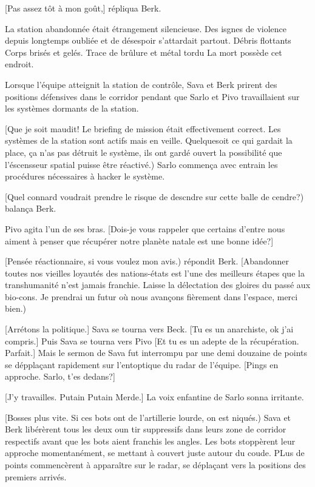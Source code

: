 [Pas assez tôt à mon goût,] répliqua Berk. 

La station abandonnée était étrangement silencieuse. Des isgnes de violence depuis longtemps oubliée et de désespoir s'attardait partout. Débris flottants Corps brisés et gelés. Trace de brûlure et métal tordu La mort possède cet endroit. 

Lorsque l'équipe atteignit la station de contrôle, Sava et Berk prirent des positions défensives dans le corridor pendant que Sarlo et Pivo travaillaient sur les systèmes dormants de la station. 

[Que je soit maudit! Le briefing de mission était effectivement correct. Les systèmes de la station sont actifs mais en veille. Quelquesoit ce qui gardait la place, ça n'as pas détruit le système, ils ont gardé ouvert la possibilité que l'éscensseur spatial puisse être réactivé.) Sarlo commença avec entrain les procédures nécessaires à hacker le système. 

[Quel connard voudrait prendre le risque de descndre sur cette balle de cendre?) balança Berk. 

Pivo agita l'un de ses bras. [Dois-je vous rappeler que certains d'entre nous aiment à penser que récupérer notre planète natale est une bonne idée?] 

[Pensée réactionnaire, si vous voulez mon avis.) répondit Berk. [Abandonner toutes nos vieilles loyautés des nations-états est l'une des meilleurs étapes que la transhumanité n'est jamais franchie. Laisse la délectation des gloires du passé aux bio-cons. Je prendrai un futur où nous avançons fièrement dans l'espace, merci bien.) 

[Arrétons la politique.] Sava se tourna vers Beck. [Tu es un anarchiste, ok j'ai compris.] Puis Sava se tourna vers Pivo [Et tu es un adepte de la récupération. Parfait.] Mais le sermon de Sava fut interrompu par une demi douzaine de points se dépplaçant rapidement sur l'entoptique du radar de l'équipe. [Pings en approche. Sarlo, t'es dedans?] 

[J'y travailles. Putain Putain Merde.] La voix enfantine de Sarlo sonna irritante. 

[Bosses plus vite. Si ces bots ont de l'artillerie lourde, on est niqués.) Sava et Berk libérèrent tous les deux oun tir suppressifs dans leurs zone de corridor respectifs avant que les bots aient franchis les angles. Les bots stoppèrent leur approche momentanément, se mettant à couvert juste autour du coude. PLus de points commencèrent à apparaître sur le radar, se déplaçant vers la positions des premiers arrivés. 

